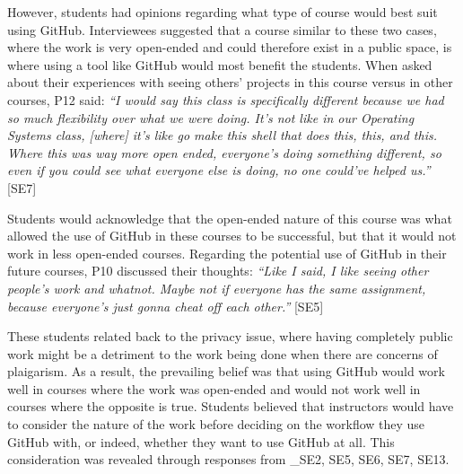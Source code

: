 However, students had opinions regarding what type of course would best suit using GitHub. Interviewees suggested that a course similar to these two cases, where the work is very open-ended and could therefore exist in a public space, is where using a tool like GitHub would most benefit the students. When asked about their experiences with seeing others' projects in this course versus in other courses, P12 said: \textit{``I would say this class is specifically different because we had so much flexibility over what we were doing. It's not like in our Operating Systems class, [where] it's like go make this shell that does this, this, and this. Where this was way more open ended, everyone's doing something different, so even if you could see what everyone else is doing, no one could've helped us.''} [SE7]

Students would acknowledge that the open-ended nature of this course was what allowed the use of GitHub in these courses to be successful, but that it would not work in less open-ended courses. Regarding the potential use of GitHub in their future courses, P10 discussed their thoughts: \textit{``Like I said, I like seeing other people's work and whatnot. Maybe not if everyone has the same assignment, because everyone's just gonna cheat off each other.''} [SE5]



These students related back to the privacy issue, where having completely public work might be a detriment to the work being done when there are concerns of plaigarism. As a result, the prevailing belief was that using GitHub would work well in courses where the work was open-ended and would not work well in courses where the opposite is true. Students believed that instructors would have to consider the nature of the work before deciding on the workflow they use GitHub with, or indeed, whether they want to use GitHub at all. This consideration was revealed through responses from _{SE2, SE5, SE6, SE7, SE13}.

